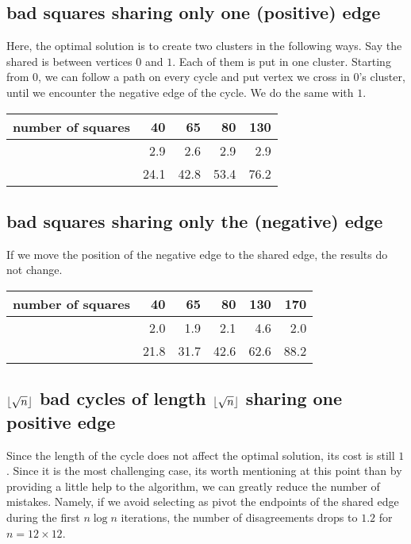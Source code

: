 \subsection{bad squares sharing only one (positive) edge}
Here, the optimal solution is to create two clusters in the following ways.
Say the shared is between vertices $0$ and $1$. Each of them is put in one
cluster. Starting from $0$, we can follow a path on every cycle and put
vertex we cross in $0$'s cluster, until we encounter the negative edge of the
cycle. We do the same with $1$.

\begin{center}
\begin{tabular}{lrrrr}
\toprule
number of squares &  40  &  65  &  80  &  130 \\
\midrule
\pot{} &  2.9 &  2.6 &  2.9 &  2.9 \\
\pat{} & 24.1 & 42.8 & 53.4 & 76.2 \\
\bottomrule
\end{tabular}
\end{center}

\subsection{bad squares sharing only the (negative) edge}

If we move the position of the negative edge to the shared edge, the results
do not change.

\begin{center}
\begin{tabular}{lrrrrr}
\toprule
number of squares &  40  &  65  &  80  &  130 &  170 \\
\midrule
\pot{} &  2.0 &  1.9 &  2.1 &  4.6 &  2.0 \\
\pat{} & 21.8 & 31.7 & 42.6 & 62.6 & 88.2 \\
\bottomrule
\end{tabular}
\end{center}

\subsection{$\floor*{\sqrt{n}}$ bad cycles of length $\floor*{\sqrt{n}}$
	sharing one positive edge}

Since the length of the cycle does not affect the optimal solution, its cost
is still $1$. Since it is the most challenging case, its worth mentioning at
this point than by providing a little help to the algorithm, we can greatly
reduce the number of mistakes. Namely, if we avoid selecting as pivot the
endpoints of the shared edge during the first $n\log n$ iterations, the
number of disagreements drops to $1.2$ for $n=12\times 12$.


